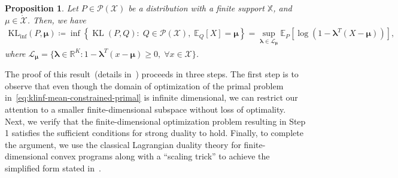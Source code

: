 \documentclass{article}
\theoremstyle{plain}
\newtheorem{proposition}[proposition]{Proposition}
\theoremstyle{definition}
\newcommand{\lrp}[1]{\left( #1 \right)}
\newcommand{\KLinf}{\operatorname{KL_{inf}}}
\newcommand{\KL}{\operatorname{KL}}
\newcommand{\calP}{\mathcal P}
\newcommand{\calX}{\mathcal X}
\newcommand{\calL}{\mathcal L}
\newcommand{\boldlambda}{\boldsymbol{\lambda}}
\newcommand{\boldmu}{\boldsymbol{\mu}}
\newcommand{\finitesupport}{\mathbb{X}}
\begin{document}
\begin{proposition}
    \label{theorem:finite-support} 
        Let $P \in \calP(\calX)$ be a distribution with a finite support $\finitesupport$, and $\mu \in \mathring{\calX}$.  Then, we have 
    \begin{align}
        \KLinf(P, \boldmu) \coloneqq \inf \left\{ \KL(P, Q):\; Q \in \calP(\calX), \; \mathbb{E}_Q[X] = \boldmu \right\} = \sup_{\boldlambda \in \calL_{\boldmu}} \mathbb{E}_P\left[ \log \lrp{1 - \boldlambda^T(X-\boldmu)}\right], \label{eq:klinf-mean-constrained-primal}
    \end{align}
    where $\calL_{\boldmu} = \{\boldlambda \in \mathbb{R}^K: 1 - \boldlambda^T(x - \boldmu) \geq 0, \; \forall x \in \calX\}$.
\end{proposition}
The proof of this result~(details in~) proceeds in three steps. The first step is to observe that even though the domain of optimization of the primal problem in~\eqref{eq:klinf-mean-constrained-primal} is infinite dimensional, we can restrict our attention to a smaller finite-dimensional subspace without loss of optimality. Next, we verify that the finite-dimensional optimization problem resulting in Step 1 satisfies the sufficient conditions for strong duality to hold. Finally, to complete the argument, we use the classical Lagrangian duality theory for finite-dimensional convex programs along with a ``scaling trick'' to achieve the simplified form stated in~. 
\end{document}
